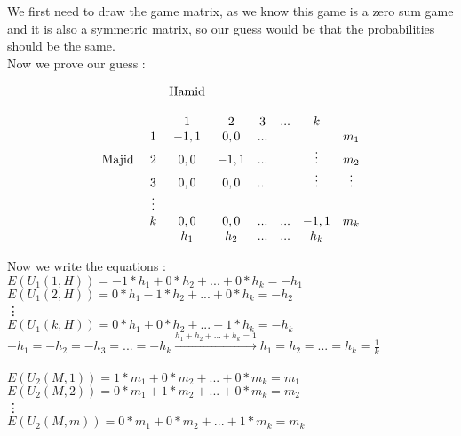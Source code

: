 \begin{latin}
   \noindent
   We first need to draw the game matrix, as we know this game is a zero sum game and it is 
   also a symmetric matrix, so our guess would be that the probabilities should be the same.\\
   Now we prove our guess : 
   \begin{center}
    \begin{equation*}
                \begin{matrix}
                      & & \text{Hamid}                  \\ \\ 
                      & & 1 & 2 & 3 & ... & k            \\
                    & 1 & -1,1 & 0,0 & ... &   &  & m_1         \\
                    \text{Majid} \hspace{1mm}& 2 & 0,0 & -1,1 & ... &  & \vdots & m_2   \\
                    & 3 & 0,0 & 0,0 & ... & & \vdots & \vdots\\
                    & \vdots \\
                    & k & 0,0 & 0,0 & ... & ... & -1,1  & m_k \\
                    &  & h_1 & h_2 & ... & ... & h_k  
                    \end{matrix}
                \end{equation*}
           \end{center}
           Now we write the equations : \\
           $E(U_1(1,H)) = -1 * h_1 + 0 * h_2 + ... + 0 * h_k = -h_1$\\
           $E(U_1(2,H)) = 0 * h_1 -1 * h_2 + ... + 0 * h_k = -h_2$\\
           \vdots \\
           $E(U_1(k,H)) = 0 * h_1 + 0 * h_2 + ... -1 * h_k = -h_k$ \\
           $-h_1 = -h_2 = -h_3 = ... = -h_k \xrightarrow{h_1+h_2+...+h_k=1} h_1 = h_2 = ... = h_k = \frac{1}{k}$ \\ \\
           \noindent
           $E(U_2(M,1)) = 1 * m_1 + 0 * m_2 + ... + 0 * m_k = m_1$\\
           $E(U_2(M,2)) = 0 * m_1 + 1 * m_2 + ... + 0 * m_k = m_2$\\
           \vdots \\
           $E(U_2(M,m)) = 0 * m_1 + 0 * m_2 + ... +1 * m_k = m_k$ \\

\end{latin}

